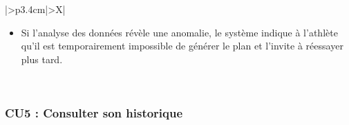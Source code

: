 \documentclass[a4paper,12pt]{report}
\begin{document}
\begin{table}[H]
\begin{tabularx}{\textwidth}{|>{\RaggedRight\arraybackslash}p{3.4cm}|>{\RaggedRight\arraybackslash}X|}
\begin{minipage}[t]{\linewidth}
\begin{itemize}[leftmargin=*, topsep=0pt, itemsep=1pt]
\item Si l’analyse des données révèle une anomalie, le système indique à l’athlète qu’il est temporairement impossible de générer le plan et l’invite à réessayer plus tard.
                                                                                        \end{itemize}
\vspace{2pt}
\end{minipage} \\
\hline
\end{tabularx}
\fussy
\end{table}

\subsubsection*{CU5 : Consulter son historique}
\end{document}
